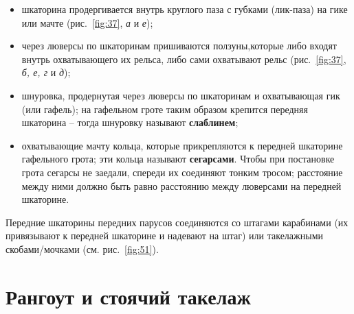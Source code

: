 \documentclass[a4paper, 12pt, twoside, final]{scrbook}
\begin{document}
\begin{itemize}
\item шкаторина продергивается внутрь круглого паза с губками (лик-паза)
на гике или мачте (рис.~\ref{fig:37}, \emph{а} и \emph{е});

\item через люверсы по шкаторинам пришиваются ползуны,которые
либо входят внутрь охватывающего их рельса, либо сами охватывают рельс
(рис.~\ref{fig:37}, \emph{б, е, г} и \emph{д});

\item шнуровка, продернутая через люверсы по шкаторинам и охватывающая
гик (или гафель); на гафельном гроте таким образом крепится передняя
шкаторина \--- тогда шнуровку называют \textbf{слаблинем};

\item охватывающие мачту кольца, которые прикрепляются к передней шкаторине
гафельного грота; эти кольца называют \textbf{сегарсами}. Чтобы при
постановке грота сегарсы не заедали, спереди их соединяют тонким тросом;
расстояние между ними должно быть равно расстоянию между люверсами
на передней шкаторине.

\end{itemize}

Передние шкаторины передних парусов соединяются со штагами карабинами
(их привязывают к передней шкаторине и надевают на штаг) или такелажными
скобами\-/мочками (см. рис.~\ref{fig:51}).

%
%

\section{Рангоут и стоячий такелаж}
\end{document}
